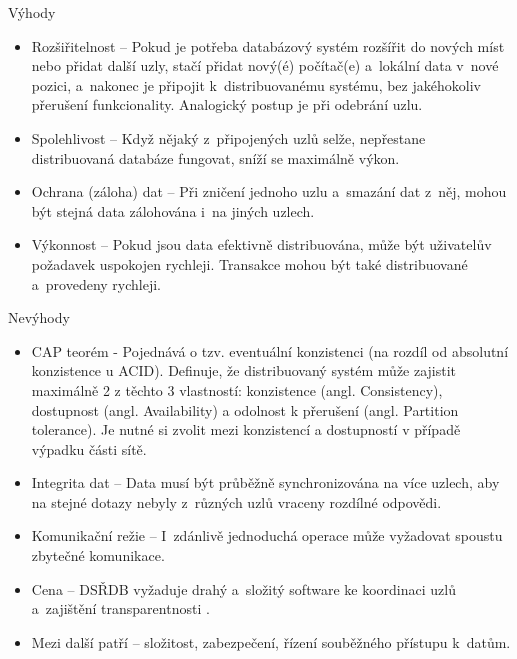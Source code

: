 \noindent Výhody
\begin{itemize}
\item Rozšiřitelnost – Pokud je potřeba databázový systém rozšířit do nových míst nebo přidat další uzly, stačí přidat nový(é) počítač(e) a~lokální data v~nové pozici, a~nakonec je připojit k~distribuovanému systému, bez jakéhokoliv přerušení funkcionality. Analogický postup je při odebrání uzlu.

\item Spolehlivost – Když nějaký z~připojených uzlů selže, nepřestane distribuovaná databáze fungovat, sníží se maximálně výkon.

\item Ochrana (záloha) dat – Při zničení jednoho uzlu a~smazání dat z~něj, mohou být stejná data zálohována i~na jiných uzlech.

\item Výkonnost – Pokud jsou data efektivně distribuována, může být uživatelův požadavek uspokojen rychleji. Transakce mohou být také distribuované a~provedeny rychleji. 
\end{itemize}

\noindent Nevýhody
\begin{itemize}
\item CAP teorém - Pojednává o tzv. eventuální konzistenci (na rozdíl od absolutní konzistence u ACID). Definuje, že distribuovaný systém může zajistit maximálně 2 z těchto 3 vlastností: konzistence (angl. Consistency), dostupnost (angl. Availability) a odolnost k přerušení (angl. Partition tolerance). Je nutné si zvolit mezi konzistencí a dostupností v případě výpadku části sítě.

\item Integrita dat – Data musí být průběžně synchronizována na více uzlech, aby na stejné dotazy nebyly z~různých uzlů vraceny rozdílné odpovědi.

\item Komunikační režie – I~zdánlivě jednoduchá operace může vyžadovat spoustu zbytečné komunikace.

\item Cena – DSŘDB vyžaduje drahý a~složitý software ke koordinaci uzlů a~zajištění transparentnosti \cite{distributedDBMS}.

\item Mezi další patří – složitost, zabezpečení, řízení souběžného přístupu k~datům.
\end{itemize}


